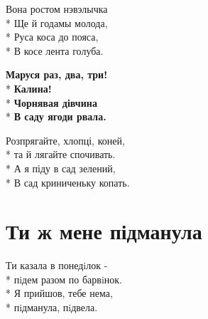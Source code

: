 \medskip

\begin{minipage}{\linewidth}
Вона ростом нэвэлычка\\*
Ще й годамы молода,\\*
Руса коса до пояса,\\*
В косе лента голуба.\\
\end{minipage}\par\medskip\nobreak

\medskip

\begin{minipage}{\linewidth}
\hspace*{1.5em}\textbf{Маруся раз, два, три!}\\*
\hspace*{1.5em}\textbf{Калина!}\\*
\hspace*{1.5em}\textbf{Чорнявая дівчина}\\*
\hspace*{1.5em}\textbf{В саду ягоди рвала.}\\
\end{minipage}\par\medskip\nobreak

\medskip

\begin{minipage}{\linewidth}
Розпрягайте, хлопці, коней,\\*
та й лягайте спочивать.\\*
А я піду в сад зелений,\\*
В сад криниченьку копать.\\
\end{minipage}

\vspace{\fill}\newpage

\section{Ти ж мене підманула}
\label{song:Ти_ж_мене_підманула}

\medskip

\begin{minipage}{\linewidth}
Ти казала в понедiлок -\\*
пiдем разом по барвiнок.\\*
Я прийшов, тебе нема,\\*
пiдманула, пiдвела.\\
\end{minipage}\par\medskip\nobreak

